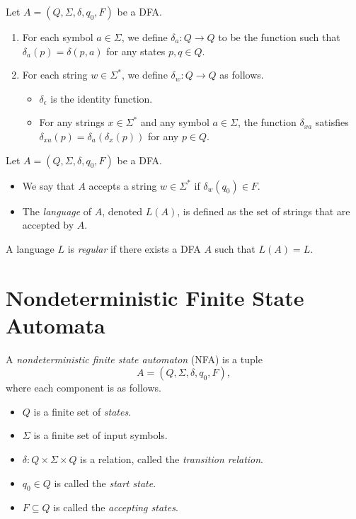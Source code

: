 \begin{definition}
  Let $A = (Q, \Sigma, \delta, q_0, F)$ be a DFA.
  \begin{enumerate}
    \item For each symbol $a \in \Sigma$, we define $\delta_a: Q \to Q$ to be
    the function such that $\delta_a(p) = \delta(p, a)$
    for any states $p, q \in Q$.
    \item For each string $w \in \Sigma^*$, we define $\delta_w: Q \to Q$ as
    follows.
    \begin{itemize}
      \item $\delta_\epsilon$ is the identity function.
      \item For any strings $x \in \Sigma^*$ and any symbol $a \in \Sigma$,
      the function $\delta_{xa}$ satisfies
      $\delta_{xa}(p) = \delta_a(\delta_x(p))$ for any $p \in Q$.
    \end{itemize}
  \end{enumerate}
\end{definition}

\begin{definition}
  Let $A = (Q, \Sigma, \delta, q_0, F)$ be a DFA.
  \begin{itemize}
    \item We say that $A$ accepts a string $w \in \Sigma^*$ if
    $\delta_w(q_0) \in F$.
    \item The \emph{language} of $A$, denoted $L(A)$, is defined as the set of
    strings that are accepted by $A$.
  \end{itemize}
\end{definition}

\begin{definition}
  A language $L$ is \emph{regular} if there exists a DFA $A$ such that
  $L(A) = L$.
\end{definition}

\section{Nondeterministic Finite State Automata}
\begin{definition}
  \label{def:nfa}
  A \emph{nondeterministic finite state automaton} (NFA) is a tuple
  \begin{equation*}
    A = (Q, \Sigma, \delta, q_0, F),
  \end{equation*}
  where each component is as follows.
  \begin{itemize}
    \item $Q$ is a finite set of \emph{states}.
    \item $\Sigma$ is a finite set of input symbols.
    \item $\delta: Q \times \Sigma \times Q$ is a relation, called the
    \emph{transition relation}.
    \item $q_0 \in Q$ is called the \emph{start state}.
    \item $F \subseteq Q$ is called the \emph{accepting states}.
  \end{itemize}
\end{definition}

